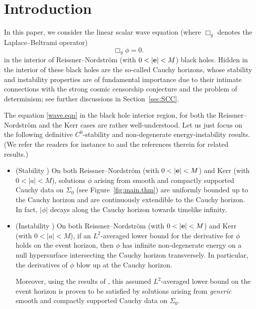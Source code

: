\documentclass[10pt, reqno]{amsart}
\theoremstyle{definition}
\theoremstyle{remark}
\numberwithin{equation}{section}
\newcommand{\0}{\emptyset}
\begin{document}
\maketitle

\section{Introduction}\label{sec:intro}

In this paper, we consider the linear scalar wave equation (where $\Box_g$ denotes the Laplace--Beltrami operator)
\begin{equation}\label{wave.eqn}
\Box_{g}\phi = 0.
\end{equation}
in the interior of Reissner--Nordstr\"om (with $0<|{\bf e}|<M$) black holes. Hidden in the interior of these black holes are the so-called Cauchy horizons, whose stability and instability properties are of fundamental importance due to their intimate connections with the strong cosmic censorship conjecture and the problem of determinism; see further discussions in Section~\ref{sec:SCC}.

The equation \eqref{wave.eqn} in the black hole interior region, for both the Reissner--Nordstr\"om and the Kerr cases are rather well-understood. Let us just focus on the following definitive $C^0$-stability and non-degenerate energy-instability results. (We refer the readers for instance to \cite{D2, DafShl, CH, GSNS, Gleeson, KSR, McN.stab, McN, Sbi.2} and the references therein for related results.)
\begin{itemize}
\item (Stability \cite{Fra, Franzen2, Hintz, LS}) On both Reissner--Nordstr\"om (with $0<|{\bf e}|<M$) and Kerr (with $0<|a|<M$), solutions $\phi$ arising from smooth and compactly supported Cauchy data on $\Sigma_0$ (see Figure~\ref{fig:main.thm}) are uniformly bounded up to the Cauchy horizon and are continuously extendible to the Cauchy horizon. In fact, $|\phi|$ decays along the Cauchy horizon towards timelike infinity.
\item (Instability \cite{D2,LO.instab, LS}) On both Reissner--Nordstr\"om (with $0<|{\bf e}|<M$) and Kerr (with $0<|a|<M$), if an $L^2$-averaged lower bound for the derivative for $\phi$ holds on the event horizon, then $\phi$ has infinite non-degenerate energy on a null hypersurface intersecting the Cauchy horizon transversely. In particular, the derivatives of $\phi$ blow up at the Cauchy horizon. 

Moreover, using the results of \cite{AAG,HintzPriceLaw,LO.instab}, this assumed $L^2$-averaged lower bound on the event horizon is proven to be satisfied by solutions arising from \emph{generic} smooth and compactly supported Cauchy data on $\Sigma_0$.
\end{itemize}
\end{document}
